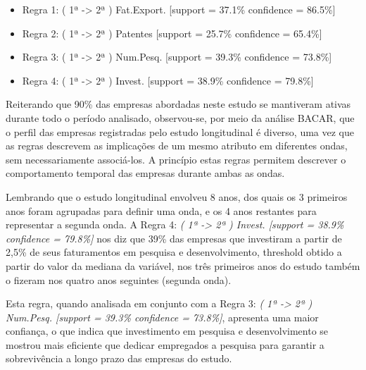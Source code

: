 \documentclass[12pt]{article}
\begin{document}
\begin{itemize}
    \item Regra 1: ( 1ª -> 2ª ) Fat.Export. [support = 37.1\% confidence = 86.5\%]
    \item Regra 2: ( 1ª -> 2ª ) Patentes [support = 25.7\% confidence = 65.4\%]
    \item Regra 3: ( 1ª -> 2ª ) Num.Pesq. [support = 39.3\% confidence = 73.8\%]
    \item Regra 4: ( 1ª -> 2ª ) Invest. [support = 38.9\% confidence = 79.8\%]
\end{itemize}

Reiterando que 90\% das empresas abordadas neste estudo se mantiveram ativas durante todo o período analisado, observou-se, por meio da análise BACAR, que o perfil das empresas registradas pelo estudo longitudinal é diverso, uma vez que as regras descrevem as implicações de um mesmo atributo em diferentes ondas, sem necessariamente associá-los. A princípio estas regras permitem descrever o comportamento temporal das empresas durante ambas as ondas.


Lembrando que o estudo longitudinal envolveu 8 anos, dos quais os 3 primeiros anos foram agrupadas para definir uma onda, e os 4 anos restantes para representar a segunda onda. A Regra 4: \textit{( 1ª -> 2ª ) Invest. [support = 38.9\% confidence = 79.8\%]} nos diz que 39\% das empresas que investiram a partir de 2,5\% de seus faturamentos em pesquisa e desenvolvimento, threshold obtido a partir do valor da mediana da variável, nos três primeiros anos do estudo também o fizeram nos quatro anos seguintes (segunda onda).

Esta regra, quando analisada em conjunto com a Regra 3: \textit{( 1ª -> 2ª ) Num.Pesq. [support = 39.3\% confidence = 73.8\%]}, apresenta uma maior confiança, o que indica que investimento em pesquisa e desenvolvimento se mostrou mais eficiente que dedicar empregados a pesquisa para garantir a sobrevivência a longo prazo das empresas do estudo.
\end{document}
